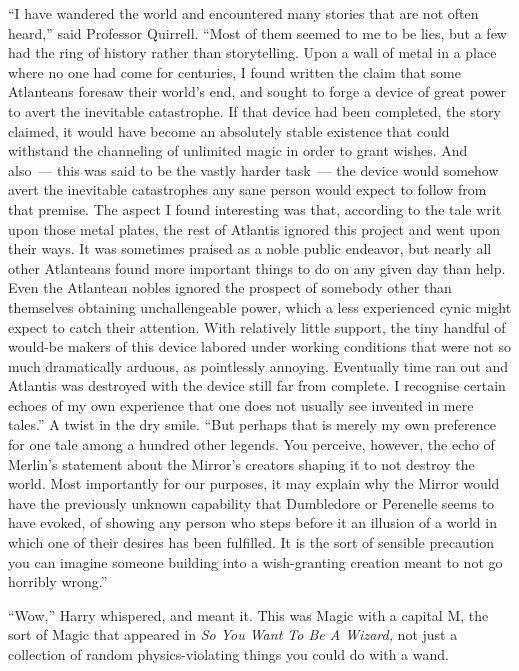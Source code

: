 ``I have wandered the world and encountered many stories that are not often heard,'' said Professor Quirrell. ``Most of them seemed to me to be lies, but a few had the ring of history rather than storytelling. Upon a wall of metal in a place where no one had come for centuries, I found written the claim that some Atlanteans foresaw their world's end, and sought to forge a device of great power to avert the inevitable catastrophe. If that device had been completed, the story claimed, it would have become an absolutely stable existence that could withstand the channeling of unlimited magic in order to grant wishes. And also~--- this was said to be the vastly harder task~--- the device would somehow avert the inevitable catastrophes any sane person would expect to follow from that premise. The aspect I found interesting was that, according to the tale writ upon those metal plates, the rest of Atlantis ignored this project and went upon their ways. It was sometimes praised as a noble public endeavor, but nearly all other Atlanteans found more important things to do on any given day than help. Even the Atlantean nobles ignored the prospect of somebody other than themselves obtaining unchallengeable power, which a less experienced cynic might expect to catch their attention. With relatively little support, the tiny handful of would-be makers of this device labored under working conditions that were not so much dramatically arduous, as pointlessly annoying. Eventually time ran out and Atlantis was destroyed with the device still far from complete. I recognise certain echoes of my own experience that one does not usually see invented in mere tales.'' A twist in the dry smile. ``But perhaps that is merely my own preference for one tale among a hundred other legends. You perceive, however, the echo of Merlin's statement about the Mirror's creators shaping it to not destroy the world. Most importantly for our purposes, it may explain why the Mirror would have the previously unknown capability that Dumbledore or Perenelle seems to have evoked, of showing any person who steps before it an illusion of a world in which one of their desires has been fulfilled. It is the sort of sensible precaution you can imagine someone building into a wish-granting creation meant to not go horribly wrong.''

``Wow,'' Harry whispered, and meant it. This was Magic with a capital M, the sort of Magic that appeared in \emph{So You Want To Be A Wizard,} not just a collection of random physics-violating things you could do with a wand.

